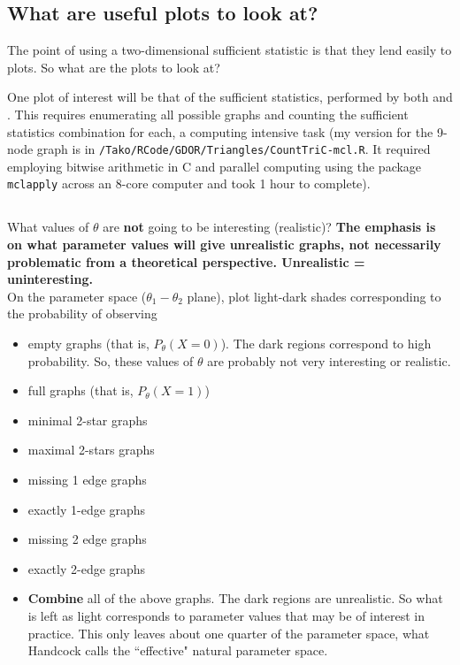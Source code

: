 \documentclass{amsbook}
\theoremstyle{definition}
\theoremstyle{remark}
\begin{document}
\subsection{What are useful plots to look at?}

The point of using a two-dimensional sufficient statistic is that they lend easily to plots.  So what are the plots to look at?

One plot of interest will be that of the sufficient statistics, performed by both \citet{Handcock:Degeneracy} and \citet{Rinaldo:2009}.  This requires enumerating all possible graphs and counting the sufficient statistics combination for each, a computing intensive task (my version for the 9-node graph is in \texttt{/Tako/RCode/GDOR/Triangles/CountTriC-mcl.R}.  It required employing bitwise arithmetic in C and parallel computing using the package \texttt{mclapply} across an 8-core computer and took 1 hour to complete).


\subsection{\citet{Handcock:Degeneracy}}


What values of $\theta$ are \textbf{not} going to be interesting (realistic)?  \textbf{The emphasis is on what parameter values will give unrealistic graphs, not necessarily problematic from a theoretical perspective.  Unrealistic = uninteresting.}  \\

On the parameter space ($\theta_1-\theta_2$ plane), plot light-dark shades corresponding to the probability of observing 
	\begin{itemize}
		\item empty graphs (that is, $P_\theta(X=0)$).  The dark regions correspond to high probability.  So, these values of $\theta$ are probably not very interesting or realistic.
		\item full graphs (that is, $P_\theta(X=1)$)
		\item minimal 2-star graphs
		\item maximal 2-stars graphs
		\item missing 1 edge graphs
		\item exactly 1-edge graphs
		\item missing 2 edge graphs
		\item exactly 2-edge graphs
		\item \textbf{Combine} all of the above graphs.  The dark regions are unrealistic.  So what is left as light corresponds to parameter values that may be of interest in practice.  This only leaves about one quarter of the parameter space, what Handcock calls the ``effective" natural parameter space.
	\end{itemize}
	
\end{document}
